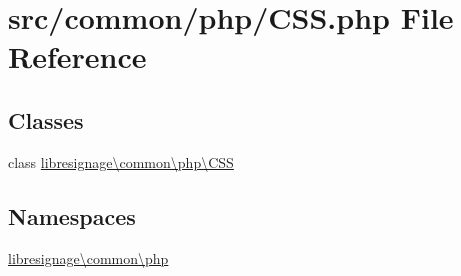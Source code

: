 \hypertarget{CSS_8php}{}\section{src/common/php/\+C\+SS.php File Reference}
\label{CSS_8php}
\subsection*{Classes}
\begin{DoxyCompactItemize}
\item 
class \hyperlink{classlibresignage_1_1common_1_1php_1_1CSS}{libresignage\textbackslash{}common\textbackslash{}php\textbackslash{}\+C\+SS}
\end{DoxyCompactItemize}
\subsection*{Namespaces}
\begin{DoxyCompactItemize}
\item 
 \hyperlink{namespacelibresignage_1_1common_1_1php}{libresignage\textbackslash{}common\textbackslash{}php}
\end{DoxyCompactItemize}
